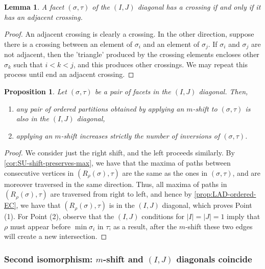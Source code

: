 \documentclass{amsart}
\newtheorem{proposition}[theorem]{Proposition}
\newtheorem{lemma}[theorem]{Lemma}
\theoremstyle{definition}
\begin{document}
\begin{lemma}
    \label{lem:adjacent-crossing}
A facet $(\sigma,\tau)$ of the $(I,J)$ diagonal has a crossing if and only if it has an adjacent crossing.
\end{lemma}

\begin{proof}
An adjacent crossing is clearly a crossing. In the other direction, suppose there is a crossing between an element of $\sigma_i$ and an element of $\sigma_j$. If $\sigma_i$ and $\sigma_j$ are not adjacent, then the 'triangle' produced by the crossing elements encloses other $\sigma_k$ such that $i<k<j$, and this produces other crossings. We may repeat this process until end an adjacent crossing.
\end{proof}

\begin{proposition} 
    \label{lem:IJ-closed-under-shifts}
    Let $(\sigma,\tau)$ be a pair of facets in the $(I,J)$ diagonal.
    Then,
    \begin{enumerate}
        \item any pair of ordered partitions obtained by applying an $m$-shift to $(\sigma,\tau)$ is also in the $(I,J)$ diagonal,
        \item applying an $m$-shift increases strictly the number of inversions of $(\sigma,\tau)$.
    \end{enumerate}
\end{proposition}

\begin{proof}
    We consider just the right shift, and the left proceeds similarly. 
    By \cref{cor:SU-shift-preserves-max}, we have that the maxima of paths between consecutive vertices in $(R_{\rho}(\sigma),\tau)$ are the same as the ones in $(\sigma,\tau)$, and are moreover traversed in the same direction.
    Thus, all maxima of paths in $(R_{\rho}(\sigma),\tau)$ are traversed from right to left, and hence by \cref{prop:LAD-ordered-EC}, we have that $(R_{\rho}(\sigma),\tau)$ is in the $(I,J)$ diagonal, which proves Point (1).
    For Point (2), observe that the $(I,J)$ conditions for $|I|=|J|=1$ imply that $\rho$ must appear before $\min \sigma_i$ in $\tau$; as a result, after the $m$-shift these two edges will create a new intersection.
\end{proof}



\subsubsection{Second isomorphism: $m$-shift and $(I,J)$ diagonals coincide}
\end{document}
